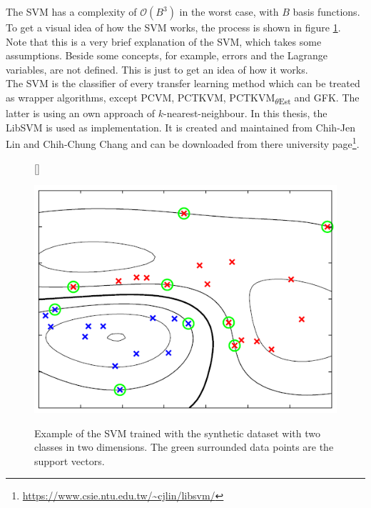 The \ac{SVM} has a complexity of $\mathcal{O}(B^3)$ in the worst case, with $B$ basis functions.\cite[p. 329]{Bishop.2009}
To get a visual idea of how the \ac{SVM} works, the process is shown in figure \ref{FigSVMProd}.\\
Note that this is a very brief explanation of the \acs{SVM}, which takes some assumptions. Beside some concepts, for example, errors and the Lagrange variables, are not defined.
This is just to get an idea of how it works.\\
The \acs{SVM} is the classifier of every transfer learning method which can be treated as wrapper algorithms, except \acs{PCVM}, \acs{PCTKVM}, \acs{PCTKVM}\textsubscript{$\theta$Est} and \acs{GFK}.
The latter is using an own approach of $k$-nearest-neighbour.
In this thesis, the LibSVM is used as implementation.
It is created and maintained from Chih-Jen Lin and Chih-Chung Chang and can be downloaded from there university page\footnote{\url{https://www.csie.ntu.edu.tw/~cjlin/libsvm/}}.
\begin{figure}
	\centering
	[\FBwidth]
	{\caption[Example of SVM Clasification]{Example of the SVM trained with the synthetic dataset with two classes in two dimensions. The green surrounded data points are the support vectors. \cite[p. 331]{Bishop.2009}}}
	{\includegraphics[width=\linewidth]{figures/SVMProd.png}\label{FigSVMProd}}
\end{figure}

